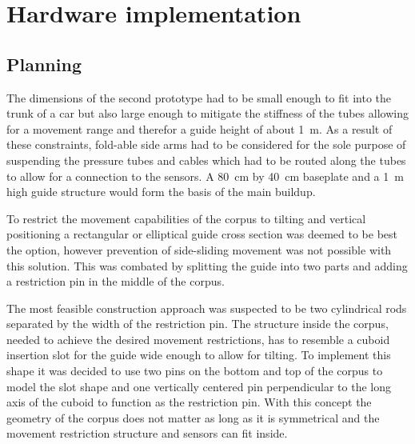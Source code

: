 \section{Hardware implementation}
\subsection{Planning}
The dimensions of the second prototype had to be small enough to fit into the trunk of a car but also large enough to mitigate the stiffness of the tubes allowing for a movement range and therefor a guide height of about \SI{1}{\meter}. As a result of these constraints, fold-able side arms had to be considered for the sole purpose of suspending the pressure tubes and cables which had to be routed along the tubes to allow for a connection to the sensors. A \SI{80}{\centi\meter} by \SI{40}{\centi\meter} baseplate and a \SI{1}{\meter} high guide structure would form the basis of the main buildup.

To restrict the movement capabilities of the corpus to tilting and vertical positioning a rectangular or elliptical guide cross section was deemed to be best the option, however prevention of side-sliding movement was not possible with this solution. This was combated by splitting the guide into two parts and adding a restriction pin in the middle of the corpus. 

The most feasible construction approach was suspected to be two cylindrical rods separated by the width of the restriction pin. The structure inside the corpus, needed to achieve the desired movement restrictions, has to resemble a cuboid insertion slot for the guide wide enough to allow for tilting. To implement this shape it was decided to use two pins on the bottom and top of the corpus to model the slot shape and one vertically centered pin perpendicular to the long axis of the cuboid to function as the restriction pin. With this concept the geometry of the corpus does not matter as long as it is symmetrical and the movement restriction structure and sensors can fit inside.  


